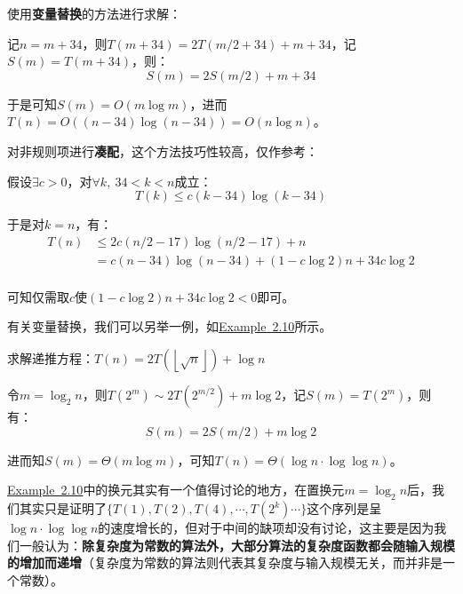 \documentclass[12pt,a4paper,violet]{bbe}
\begin{document}
\begin{solution}[\textbf{（方法2）}]
	使用\textbf{变量替换}的方法进行求解：
	
	记$n=m+34$，则$T(m+34)=2T(m/2+34)+m+34$，记$S(m)=T(m+34)$，则：
	$$
	S(m)=2S(m/2)+m+34
	$$
	
	于是可知$S(m)=O(m\log m)$，进而$T(n)=O((n-34)\log(n-34))=O(n\log n)$。
\end{solution}
\begin{solution}
	对非规则项进行\textbf{凑配}，这个方法技巧性较高，仅作参考：
	
	假设$\exists c>0$，对$\forall k,~34<k<n$成立：
	$$
	T(k)\leqslant c(k-34)\log (k-34)
	$$
	
	于是对$k=n$，有：
	$$
	\begin{array}{rl}
			T(n)&\leqslant 2c(n/2-17)\log (n/2-17)+n\\
			&=c(n-34)\log (n-34)+(1-c\log2)n+34c\log2\\
	\end{array}
	$$
	
	可知仅需取$c$使$(1-c\log2)n+34c\log2<0$即可。
\end{solution}
有关变量替换，我们可以另举一例，如\hyperref[ex2.10]{Example~2.10}所示。
\begin{example}\label{ex2.10}
	求解递推方程：$T(n)=2T(\left\lfloor\sqrt{n}\right\rfloor)+\log n$
\end{example}
\begin{solution}
	令$m=\log_2n$，则$T(2^m)\sim2T(2^{m/2})+m\log2$，记$S(m)=T(2^m)$，则有：
	$$
	S(m)=2S(m/2)+m\log 2
	$$
	
	进而知$S(m)=\Theta(m\log m)$，可知$T(n)=\Theta(\log n\cdot\log\log n)$。
\end{solution}
\begin{remark}
	\hyperref[ex2.10]{Example~2.10}中的换元其实有一个值得讨论的地方，在置换元$m=\log_2 n$后，我们其实只是证明了$\{T(1),T(2),T(4),\cdots,T(2^k)\cdots\}$这个序列是呈$\log n\cdot\log\log n$的速度增长的，但对于中间的缺项却没有讨论，这主要是因为我们一般认为：\textbf{除复杂度为常数的算法外，大部分算法的复杂度函数都会随输入规模的增加而递增}（复杂度为常数的算法则代表其复杂度与输入规模无关，而并非是一个常数）。
\end{remark}
\end{document}
